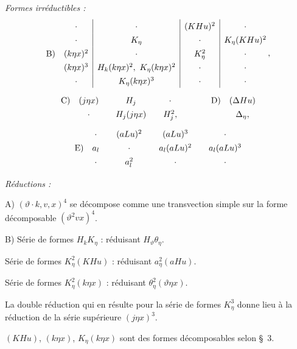 \documentclass[11pt]{article}
\newcommand{\A}{\Delta}
\begin{document}
\noindent\emph{Formes irréductibles :}
\[
\renewcommand{\arraystretch}{1.35}
\begin{array}{@{}r@{\quad}c|c|c|c@{}}
&\cdot&\cdot&(KHu)^2&\cdot\\
&\cdot&K_\eta&\cdot&K_\eta(KHu)^2\\
\text{B)}&(k\eta x)^2&\cdot&K_\eta^2&\cdot\\
&(k\eta x)^3&H_k(k\eta x)^2,\ K_\eta(k\eta x)^2&\cdot&\cdot\\
&\cdot&K_\eta(k\eta x)^3&\cdot&\cdot
\end{array}\, ,
\]
\[
\renewcommand{\arraystretch}{1.35}
\begin{array}{@{}r@{\quad}c@{\qquad}c@{\qquad}c@{\qquad\qquad}r@{\quad}c@{}}
\text{C)}&(j\eta x)&H_j&\cdot&\text{D)}&(\A Hu)\\
&\cdot&H_j(j\eta x)&H_j^2,&&\A_\eta,
\end{array}
\]
\[
\renewcommand{\arraystretch}{1.35}
\begin{array}{@{}r@{\quad}c@{\qquad}c@{\qquad}c@{\qquad}c@{}}
&\cdot&(aLu)^2&(aLu)^3&\cdot\\
\text{E)}&a_l&\cdot&a_l(aLu)^2&a_l(aLu)^3\\
&\cdot&a_l^2&\cdot&\cdot
\end{array}
\]

\noindent\emph{Réductions :}

\noindent A) $(\vartheta\cdot k,v,x)^4$ se décompose comme une transvection simple sur la forme décomposable $(\vartheta^2vx)^4$.

\noindent B) Série de formes $H_kK_\eta$ : réduisant $H_\vartheta\theta_\eta$.

Série de formes $K_\eta^2(KHu)$ : réduisant $a_\eta^2(aHu)$.

Série de formes $K_\eta^2(k\eta x)$ : réduisant $\theta_\eta^2(\vartheta\eta x)$.

La double réduction qui en résulte pour la série de formes $K_\eta^3$ donne lieu à la réduction de la série supérieure $(j\eta x)^3$.

$(KHu)$, $(k\eta x)$, $K_\eta(k\eta x)$ sont des formes décomposables selon \S\ 3.
\end{document}
